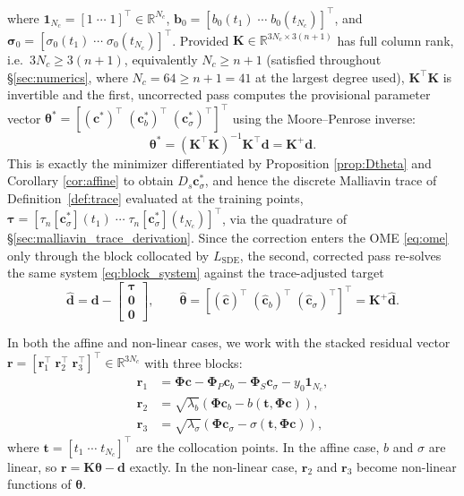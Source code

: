 \documentclass[11pt, a4paper]{article}
\theoremstyle{theoremstyle}
\theoremstyle{definitionstyle}
\begin{document}
where $\mathbf 1_{N_c} = [1 \; \cdots \; 1]^\top \in \mathbb R^{N_c}$, $\mathbf b_0 = [b_0(t_1) \; \cdots \; b_0(t_{N_c})]^\top$, and $\boldsymbol \sigma_0 = [\sigma_0(t_1) \; \cdots \; \sigma_0(t_{N_c})]^\top$. Provided $\mathbf K \in \mathbb R^{3N_c\times3(n+1)}$ has full column rank, i.e.\ $3N_c \ge 3(n+1)$, equivalently $N_c\ge n+1$ (satisfied throughout \S\ref{sec:numerics}, where $N_c=64\ge n+1=41$ at the largest degree used), $\mathbf K^\top\mathbf K$ is invertible and the first, uncorrected pass computes the provisional parameter vector $\boldsymbol \theta^* = [(\mathbf c^*)^\top \; (\mathbf c_b^*)^\top \; (\mathbf c_\sigma^*)^\top]^\top$ using the Moore--Penrose inverse:
\begin{equation}\label{eq:theta_star}
    \boldsymbol \theta^* = (\mathbf K^\top \mathbf K)^{-1}\mathbf K^\top \mathbf d = \mathbf K^+ \mathbf d.
\end{equation}
This is exactly the minimizer differentiated by Proposition \ref{prop:Dtheta} and Corollary \ref{cor:affine} to obtain $D_s\mathbf c_\sigma^*$, and hence the discrete Malliavin trace of Definition~\ref{def:trace} evaluated at the training points, $\boldsymbol \tau = [\tau_n[\mathbf c_\sigma^*](t_1) \; \cdots \; \tau_n[\mathbf c_\sigma^*](t_{N_c})]^\top$, via the quadrature of \S\ref{sec:malliavin_trace_derivation}. Since the correction enters the OME \eqref{eq:ome} only through the block collocated by $L_{\mathrm{SDE}}$, the second, corrected pass re-solves the same system \eqref{eq:block_system} against the trace-adjusted target
\begin{equation}\label{eq:d_corrected}
    \hat{\mathbf d} = \mathbf d - \begin{bmatrix} \boldsymbol \tau \\ \mathbf 0 \\ \mathbf 0 \end{bmatrix}, \qquad
    \hat{\boldsymbol \theta} = [(\hat{\mathbf c})^\top \; (\hat{\mathbf c}_b)^\top \; (\hat{\mathbf c}_\sigma)^\top]^\top = \mathbf K^+ \hat{\mathbf d}.
\end{equation}

In both the affine and non-linear cases, we work with the stacked residual vector $\mathbf r = [\mathbf r_1^\top \; \mathbf r_2^\top \; \mathbf r_3^\top]^\top \in \mathbb R^{3N_c}$ with three blocks:
\begin{align}
    \mathbf r_1 &= \boldsymbol\Phi \mathbf c - \boldsymbol\Phi_P \mathbf c_b - \boldsymbol\Phi_S \mathbf c_\sigma - y_0\mathbf 1_{N_c}, \label{eq:r_ome} \\
    \mathbf r_2 &= \sqrt{\lambda_b} \left (\boldsymbol\Phi \mathbf c_b - b(\mathbf t, \boldsymbol\Phi \mathbf c) \right ), \label{eq:r_drift} \\
    \mathbf r_3 &= \sqrt{\lambda_\sigma} \left (\boldsymbol\Phi \mathbf c_\sigma - \sigma(\mathbf t, \boldsymbol\Phi \mathbf c) \right ), \label{eq:r_diffusion}
\end{align}
where $\mathbf t = [t_1 \; \cdots \; t_{N_c}]^\top$ are the collocation points. In the affine case, $b$ and $\sigma$ are linear, so $\mathbf r = \mathbf K \boldsymbol\theta - \mathbf d$ exactly. In the non-linear case, $\mathbf r_2$ and $\mathbf r_3$ become non-linear functions of $\boldsymbol \theta$.
\end{document}
